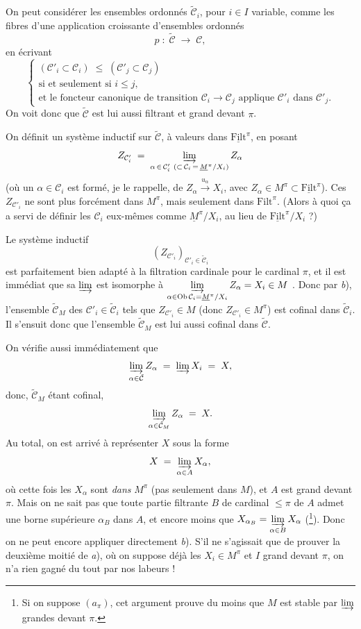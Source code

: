 On peut considérer les ensembles ordonnés $\tilde{\mathcal{C}}_i$, pour $i\in I$ variable, comme les fibres d'une application croissante d'ensembles ordonnés
\[ p \;:\; \tilde{\mathcal{C}} \;\longrightarrow\; \mathcal{C}, \]
en écrivant
\[ \left\{ \begin{array}{l}
(\mathcal{C}'_i\subset\mathcal{C}_i) \;\le\; (\mathcal{C}'_j\subset\mathcal{C}_j) \\
\text{si et seulement si } i\le j, \\
\text{et le foncteur canonique de transition } \mathcal{C}_i\longrightarrow\mathcal{C}_j \text{ applique } \mathcal{C}'_i \text{ dans } \mathcal{C}'_j.
\end{array}\right. \]
On voit donc que $\tilde{\mathcal{C}}$ est lui aussi filtrant et grand devant $\pi$.

On définit un système inductif sur $\tilde{\mathcal{C}}$, à valeurs dans $\underline{\mathrm{Filt}}^\pi$, en posant
\[ Z_{\mathcal{C}'_i} \;=\; \varinjlim_{\alpha\,\in\,\mathcal{C}'_i\ (\subset\,\mathcal{C}_i\,=\,\underline{M}^\pi/X_i)} Z_\alpha \]
(où un $\alpha\in\mathcal{C}_i$ est formé, je le rappelle, de $Z_\alpha\xrightarrow{u_\alpha}X_i$, avec $Z_\alpha\in M^\pi\subset\underline{\mathrm{Filt}}^\pi$). Ces $Z_{\mathcal{C}'_i}$ ne sont plus forcément dans $M^\pi$, mais seulement dans $\mathrm{Filt}^\pi$. (Alors à quoi ça a servi de définir les $\mathcal{C}_i$ eux-mêmes comme $\underline{M}^\pi/X_i$, au lieu de $\underline{\mathrm{Filt}}^\pi/X_i$ ?)

Le système inductif
\[ (Z_{\mathcal{C}'_i})_{\mathcal{C}'_i\in\tilde{\mathcal{C}}_i} \]
est parfaitement bien adapté à la filtration cardinale pour le cardinal $\pi$, et il est immédiat que sa $\varinjlim$ est isomorphe à $\varinjlim\limits_{\alpha\in\operatorname{Ob}\mathcal{C}_i=\underline{M}^\pi/X_i} Z_\alpha = X_i\in M$ . Donc par \textit{b}), l'ensemble $\tilde{\mathcal{C}}_M$ des $\mathcal{C}'_i\in\tilde{\mathcal{C}}_i$ tels que $Z_{\mathcal{C}'_i}\in M$ (donc $Z_{\mathcal{C}'_i}\in M^\pi$) est cofinal dans $\tilde{\mathcal{C}}_i$. Il s'ensuit donc que l'ensemble $\tilde{\mathcal{C}}_M$ est lui aussi cofinal dans $\tilde{\mathcal{C}}$.


On vérifie aussi immédiatement que
\[ \varinjlim_{\alpha\in\tilde{\mathcal{C}}} Z_\alpha \;=\; \varinjlim X_i \;=\; X, \]
donc, $\tilde{\mathcal{C}}_M$ étant cofinal,
\[ \varinjlim_{\alpha\in\tilde{\mathcal{C}}_M} Z_\alpha \;=\; X. \]
Au total, on est arrivé à représenter $X$ sous la forme
\[ X \;=\; \varinjlim_{\alpha\in A} X_\alpha, \]
où cette fois les $X_\alpha$ sont \textit{dans} $M^\pi$ (pas seulement dans $M$), et $A$ est grand devant $\pi$. Mais on ne sait pas que toute partie filtrante $B$ de cardinal $\le\pi$ de $A$ admet une borne supérieure $\alpha_B$ dans $A$, et encore moins que $X_{\alpha_B} = \varinjlim\limits_{\alpha\in B} X_\alpha$ (\footnote[45]{Si on suppose $(a_\pi)$, cet argument prouve du moins que $M$ est stable par $\varinjlim$ grandes devant $\pi$.}). Donc on ne peut encore appliquer directement \textit{b}). S'il ne s'agissait que de prouver la deuxième moitié de \textit{a}), où on suppose déjà les $X_i\in M^\pi$ et $I$ grand devant $\pi$, on n'a rien gagné du tout par nos labeurs !

